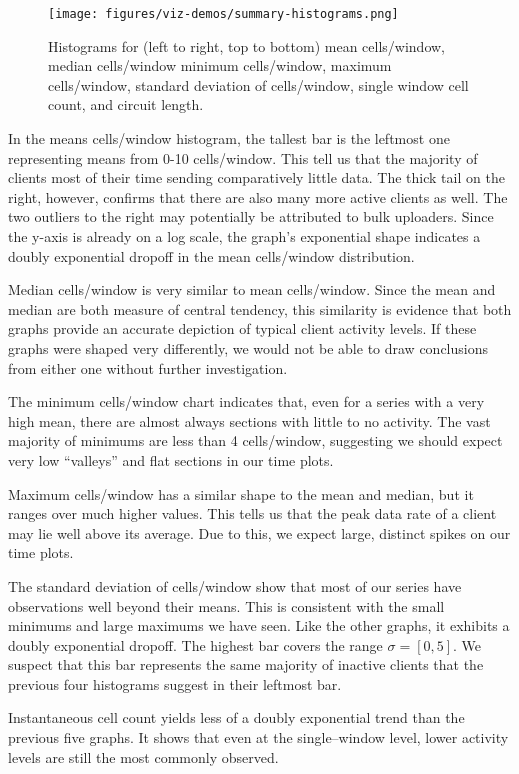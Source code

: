 \begin{figure}
	\centerline{\texttt{[image: figures/viz-demos/summary-histograms.png]}}
	\caption{Histograms for (left to right, top to bottom) mean cells/window, median cells/window minimum cells/window, maximum cells/window, standard deviation of cells/window, single window cell count, and circuit length.}
	\label{fig:datahistograms}
\end{figure}

 In the means cells/window histogram, the tallest bar is the leftmost one representing means from 0-10 cells/window. This tell us that the majority of clients most of their time sending comparatively little data. The thick tail on the right, however, confirms that there are also many more active clients as well. The two outliers to the right may potentially be attributed to bulk uploaders. Since the y-axis is already on a log scale, the graph's exponential shape indicates a doubly exponential dropoff in the mean cells/window distribution.

 Median cells/window is very similar to mean cells/window. Since the mean and median are both measure of central tendency, this similarity is evidence that both graphs provide an accurate depiction of typical client activity levels. If these graphs were shaped very differently, we would not be able to draw conclusions from either one without further investigation.

The minimum cells/window chart indicates that, even for a series with a very high mean, there are almost always sections with little to no activity. The vast majority of minimums are less than 4 cells/window, suggesting we should expect very low ``valleys'' and flat sections in our time plots.

Maximum cells/window has a similar shape to the mean and median, but it ranges over much higher values. This tells us that the peak data rate of a client may lie well above its average. Due to this, we expect large, distinct spikes on our time plots.

The standard deviation of cells/window show that most of our series have observations well beyond their means. This is consistent with the small minimums and large maximums we have seen. Like the other graphs, it exhibits a doubly exponential dropoff. The highest bar covers the range $\sigma = [0, 5]$. We suspect that this bar represents the same majority of inactive clients that the previous four histograms suggest in their leftmost bar.

Instantaneous cell count yields less of a doubly exponential trend than the previous five graphs. It shows that even at the single--window level, lower activity levels are still the most commonly observed.

